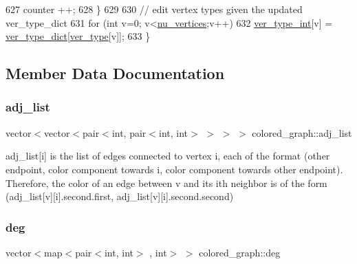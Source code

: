 \begin{DoxyCode}
627     counter ++;
628   \}
629 
630   \textcolor{comment}{// edit vertex types given the updated ver\_type\_dict}
631   \textcolor{keywordflow}{for} (\textcolor{keywordtype}{int} v=0; v<\hyperlink{classcolored__graph_a90ece8eb1fec52f3f41549ab527c1d5b}{nu\_vertices};v++)
632     \hyperlink{classcolored__graph_a491ed2ea1a65118af02ec606c8d44c0a}{ver\_type\_int}[v] = \hyperlink{classcolored__graph_aeb780762429ddac375799f4a45405712}{ver\_type\_dict}[\hyperlink{classcolored__graph_a2cc32e7146fa3319f83cfa940f5e1be4}{ver\_type}[v]]; 
633 \}
\end{DoxyCode}


\subsection{Member Data Documentation}
\mbox{\label{classcolored__graph_a45dce16965079286cf3f41a54a1b2ea4}} 
\subsubsection{\texorpdfstring{adj\+\_\+list}{adj\_list}}
{\footnotesize\ttfamily vector$<$vector$<$pair$<$int, pair$<$int, int$>$ $>$ $>$ $>$ colored\+\_\+graph\+::adj\+\_\+list}



adj\+\_\+list\mbox{[}i\mbox{]} is the list of edges connected to vertex i, each of the format (other endpoint, color component towards i, color component towards other endpoint). Therefore, the color of an edge between v and its ith neighbor is of the form (adj\+\_\+list\mbox{[}v\mbox{]}\mbox{[}i\mbox{]}.second.\+first, adj\+\_\+list\mbox{[}v\mbox{]}\mbox{[}i\mbox{]}.second.\+second) 

\mbox{\label{classcolored__graph_ae3269d35c1b022bc70d195bebd4e1b8a}} 
\subsubsection{\texorpdfstring{deg}{deg}}
{\footnotesize\ttfamily vector$<$map$<$pair$<$int, int$>$ , int$>$ $>$ colored\+\_\+graph\+::deg}



